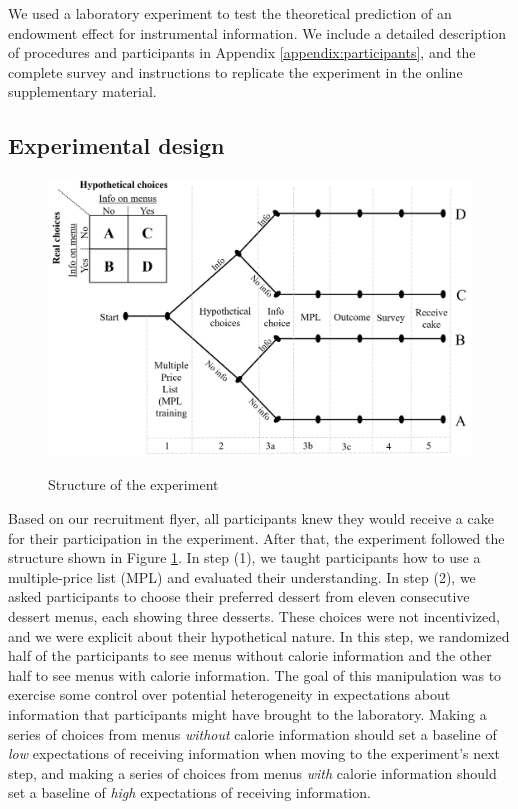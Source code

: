 
We used a laboratory experiment to test the theoretical prediction of an endowment effect for instrumental information. We include a detailed description of procedures and participants in Appendix \ref{appendix:participants}, and the complete survey and instructions to replicate the experiment in the online supplementary material.

\subsection{Experimental design}

\begin{figure}[ht]
  \caption{Structure of the experiment}\label{fig:expDesign}
  \begin{center}
  {\includegraphics[width=1\textwidth]{./figures/experimentalDesign.png}}
  \end{center}
\end{figure}

Based on our recruitment flyer, all participants knew they would receive a cake for their participation in the experiment. After that, the experiment followed the structure shown in Figure \ref{fig:expDesign}. In step (1), we taught participants how to use a multiple-price list (MPL) and evaluated their understanding. In step (2), we asked participants to choose their preferred dessert from eleven consecutive dessert menus, each showing three desserts. These choices were not incentivized, and we were explicit about their hypothetical nature. In this step, we randomized half of the participants to see menus without calorie information and the other half to see menus with calorie information. The goal of this manipulation was to exercise some control over potential heterogeneity in expectations about information that participants might have brought to the laboratory. Making a series of choices from menus \emph{without} calorie information should set a baseline of \emph{low} expectations of receiving information when moving to the experiment’s next step, and making a series of choices from menus \emph{with} calorie information should set a baseline of \emph{high} expectations of receiving information.

